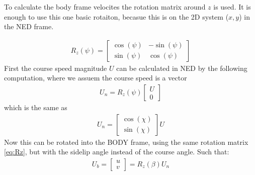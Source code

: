 To calculate the body frame velocites the rotation matrix around $z$ is used. It is enough to use this one basic rotaiton, becasue this is on the 2D system ($x,y$) in the \ac{NED} frame.

\begin{align}
R_{z} (\psi) =
\begin{bmatrix}
\cos(\psi) & -\sin(\psi)\\
\sin(\psi) & \cos(\psi)
\end{bmatrix}
\label{eq:Rz}
\end{align}
First the course speed magnitude $U$ can be calculated in \ac{NED} by the following computation, where we assuem the course speed is a vector
\begin{align}
U_n = R_{z} (\psi)
\begin{bmatrix}
U \\ 0 
\end{bmatrix}
\end{align}
which is the same as
\begin{align}
U_n =
\begin{bmatrix}
\cos(\chi) \\
\sin(\chi)
\end{bmatrix}
U
\end{align}
Now this can be rotated into the \ac{BODY} frame, using the same rotation matrix \vref{eq:Rz}, but with the sidelip angle instead of the course angle. Such that:
\begin{align}
U_b = \begin{bmatrix}
u \\ v
\end{bmatrix}
= R_z (\beta) U_n
\end{align}

